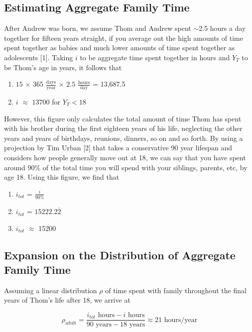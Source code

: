 \documentclass{article}
\begin{document}
\subsection{Estimating Aggregate Family Time}

After Andrew was born, we assume Thom and Andrew spent $\sim$2.5 hours a day together for fifteen years straight, if you average out the high amounts of time spent together as babies and much lower amounts of time spent together as adolescents [1]. Taking $i$ to be aggregate time spent together in hours and $Y_T$ to be Thom's age in years, it follows that

\begin{enumerate}
    \item $15$  $\times$ 365 $\frac{\text{days}}{\text{year}}$
    $\times$ $2.5$ $\frac{\text{hours}}{\text{day}}$ = 13,687.5 \\
    \item $i$ $\approx$ $13700$  for $Y_T < 18$
\end{enumerate} 

However, this figure only calculates the total amount of time Thom has spent with his brother during the first eighteen years of his life, neglecting the other years and years of birthdays, reunions, dinners, so on and so forth. By using a projection by Tim Urban [2] that takes a conservative 90 year lifespan and considers how people generally move out at 18, we can say that you have spent around $90\%$ of the total time you will spend with your siblings, parents, etc, by age 18. Using this figure, we find that

\begin{enumerate}
    \item $i_{tot}$ = $\frac{i}{90\%}$ \\
    \item $i_{tot}$ = $15222.2\overline{2}$ \\
    \item $i_{tot}$ $\approx$ 15200 
\end{enumerate}

\subsection{Expansion on the Distribution of Aggregate Family Time}
Assuming a linear distribution $\rho$ of time spent with family throughout the final years of Thom's life after 18, we arrive at

\[
\rho_{\text{adult}} = \frac{i_{tot} \text{ hours} - i  \text{ hours}}{90 \text{ years}-18\text{ years}} \approx 21 \text{ hours/year}
\]
\end{document}
